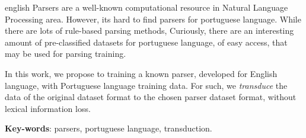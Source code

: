 \setlength{\absparsep}{18pt} %

\begin{resumo}[Abstract]
 \begin{otherlanguage*}{english}
    Parsers are a well-known computational resource in Natural Language Processing area. However, its hard to find parsers for portuguese language. 
    While there are lots of rule-based
  parsing    
   methods,  Curiously, there are an interesting amount of pre-classified datasets for portuguese language, of easy access, that may be used for parsing training.
    
    In this work, we propose to training a known parser, developed for English language, with Portuguese language training data. For such, we \textit{transduce} the data
    of the original dataset format to the chosen parser dataset format, without lexical information loss.

   \vspace{\onelineskip}
 
   \noindent 
   \textbf{Key-words}: parsers, portuguese language, transduction.
 \end{otherlanguage*}
\end{resumo}